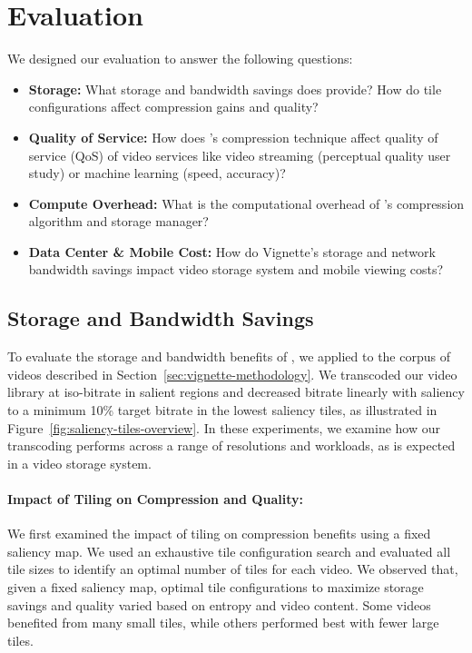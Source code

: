 

\section{Evaluation}
\label{sec:vignette-eval}

We designed our evaluation to answer the following questions:

\begin{itemize}
 \item \textbf{Storage:} What storage and bandwidth savings does \name provide? How do tile configurations affect compression gains and quality?
 \item \textbf{Quality of Service:} How does \name's compression technique affect quality of service (QoS) of video services like video streaming (perceptual quality user study) or machine learning (speed, accuracy)? %
 \item \textbf{Compute Overhead:} What is the computational overhead of \name's compression algorithm and storage manager?
 \item \textbf{Data Center \& Mobile Cost:} How do Vignette's storage and network bandwidth savings impact video storage system and mobile viewing costs?
\end{itemize}

\subsection{Storage and Bandwidth Savings}
\label{subsec:storage}
To evaluate the storage and bandwidth benefits of \name, we applied \nameCompress to the corpus of videos described in Section~\ref{sec:vignette-methodology}.
We transcoded our video library at iso-bitrate in salient regions and decreased bitrate linearly with saliency to a minimum 10\% target bitrate in the lowest saliency tiles, as illustrated in Figure~\ref{fig:saliency-tiles-overview}.
In these experiments, we examine how our transcoding performs across a range of resolutions and workloads, as is expected in a video storage system.


\paragraph{Impact of Tiling on Compression and Quality: } We first examined the impact of tiling on compression benefits using a fixed saliency map.
We used an exhaustive tile configuration search and evaluated all tile sizes to identify an optimal number of tiles for each video.
We observed that, given a fixed saliency map, optimal tile configurations to maximize storage savings and quality varied based on entropy and video content.
Some videos benefited from many small tiles, while others performed best with fewer large tiles.


